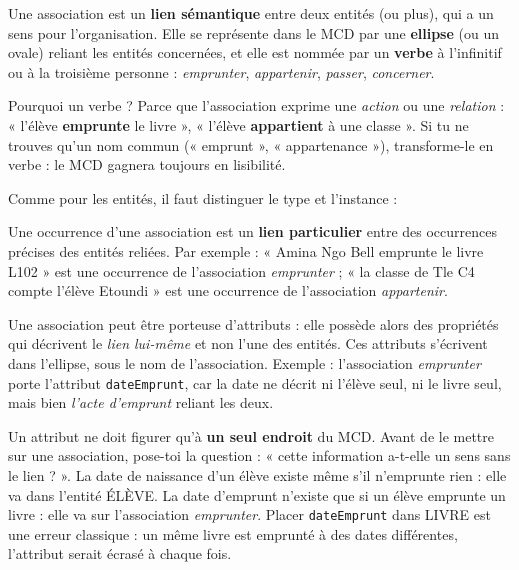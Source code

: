 \documentclass[11pt]{article}
\newcommand{\cle}[1]{{\popxbold\color{popdark}#1}}
\newcounter{popsec}
\newcounter{popsub}
\newcommand{\courssub}[1]{%
  \stepcounter{popsub}%
  \par\vspace{9pt}\noindent{\popxbold\fontsize{11.5}{13}\selectfont\color{popink}{\color{poporange}\thepopsec.\thepopsub}\hspace{6pt}#1}\par\nopagebreak\vspace{4pt}
}
\begin{document}
\courssub{Association : un lien nommé entre entités}

\begin{definition}[Association]
Une \cle{association} est un \textbf{lien sémantique} entre deux entités (ou plus), qui a un sens pour l'organisation. Elle se représente dans le MCD par une \textbf{ellipse} (ou un ovale) reliant les entités concernées, et elle est nommée par un \textbf{verbe} à l'infinitif ou à la troisième personne : \emph{emprunter}, \emph{appartenir}, \emph{passer}, \emph{concerner}.
\end{definition}

Pourquoi un verbe ? Parce que l'association exprime une \emph{action} ou une \emph{relation} : « l'élève \textbf{emprunte} le livre », « l'élève \textbf{appartient} à une classe ». Si tu ne trouves qu'un nom commun (« emprunt », « appartenance »), transforme-le en verbe : le MCD gagnera toujours en lisibilité.

Comme pour les entités, il faut distinguer le type et l'instance :

\begin{definition}
Une \cle{occurrence} d'une association est un \textbf{lien particulier} entre des occurrences précises des entités reliées. Par exemple : « Amina Ngo Bell emprunte le livre L102 » est une occurrence de l'association \emph{emprunter} ; « la classe de Tle C4 compte l'élève Etoundi » est une occurrence de l'association \emph{appartenir}.
\end{definition}

\begin{definition}
Une association peut être \cle{porteuse d'attributs} : elle possède alors des propriétés qui décrivent le \emph{lien lui-même} et non l'une des entités. Ces attributs s'écrivent dans l'ellipse, sous le nom de l'association. Exemple : l'association \emph{emprunter} porte l'attribut \texttt{dateEmprunt}, car la date ne décrit ni l'élève seul, ni le livre seul, mais bien \emph{l'acte d'emprunt} reliant les deux.
\end{definition}

\begin{attention}
Un attribut ne doit figurer qu'à \textbf{un seul endroit} du MCD. Avant de le mettre sur une association, pose-toi la question : « cette information a-t-elle un sens sans le lien ? ». La date de naissance d'un élève existe même s'il n'emprunte rien : elle va dans l'entité ÉLÈVE. La date d'emprunt n'existe que si un élève emprunte un livre : elle va sur l'association \emph{emprunter}. Placer \texttt{dateEmprunt} dans LIVRE est une erreur classique : un même livre est emprunté à des dates différentes, l'attribut serait écrasé à chaque fois.
\end{attention}
\end{document}
